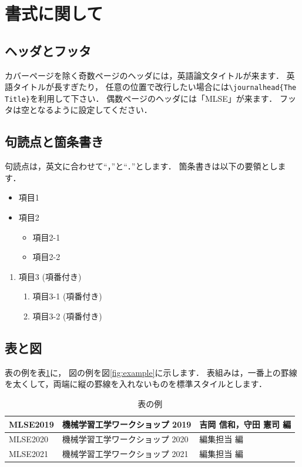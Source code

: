 \documentclass{mlse2019}           %
\begin{document}
\section{書式に関して}

\subsection{ヘッダとフッタ}
カバーページを除く奇数ページのヘッダには，英語論文タイトルが来ます．
英語タイトルが長すぎたり，
任意の位置で改行したい場合には\verb|\journalhead{The Title}|を利用して下さい．
偶数ページのヘッダには「MLSE」が来ます．
フッタは空となるように設定してください．

\subsection{句読点と箇条書き}
句読点は，英文に合わせて``，''と``．''とします．
箇条書きは以下の要領とします．
\begin{itemize}
\item 項目1
\item 項目2
  \begin{itemize}
  \item 項目2-1
  \item 項目2-2
  \end{itemize}
\end{itemize}

\begin{enumerate}
\item 項目3 (項番付き)
  \begin{enumerate}
  \item 項目3-1 (項番付き)
  \item 項目3-2 (項番付き)
  \end{enumerate}
\end{enumerate}

\subsection{表と図}

表の例を表\ref{tab:example}に，
図の例を図\ref{fig:example}に示します．
表組みは，一番上の罫線を太くして，両端に縦の罫線を入れないものを標準スタイルとします．

\begin{table}[htbp]
  \centering
  \caption{表の例} \label{tab:example}
  \begin{tabular}{l|l|l}\hline\hline
    MLSE2019 & 機械学習工学ワークショップ 2019 & 吉岡 信和，守田 憲司 編
   \\ \hline
    MLSE2020 & 機械学習工学ワークショップ 2020 & 編集担当 編 \\ \hline
    MLSE2021 & 機械学習工学ワークショップ 2021 & 編集担当 編 \\ \hline
  \end{tabular}
\end{table}
\end{document}
